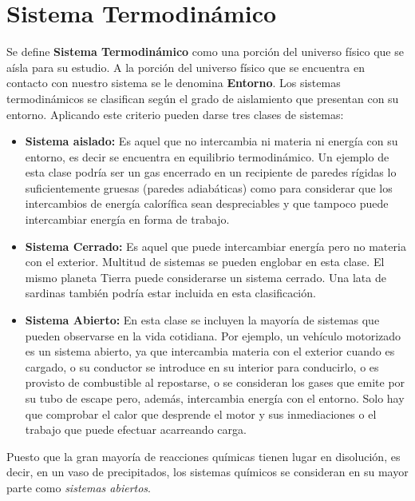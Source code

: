 \section{Sistema Termodinámico}

Se define \textbf{Sistema Termodinámico} como una porción del universo físico que se aísla para su estudio. A la porción del universo físico que se encuentra en contacto con nuestro sistema se le denomina \textbf{Entorno}. Los sistemas termodinámicos se clasifican según el grado de aislamiento que presentan con su entorno. Aplicando este criterio pueden darse tres clases de sistemas:\\

\begin{itemize}
	\item \textbf{Sistema aislado:} Es aquel que no intercambia ni materia ni energía con su entorno, es decir se encuentra en equilibrio termodinámico. Un ejemplo de esta clase podría ser un gas encerrado en un recipiente de paredes rígidas lo suficientemente gruesas (paredes adiabáticas) como para considerar que los intercambios de energía calorífica sean despreciables y que tampoco puede intercambiar energía en forma de trabajo.\\
	
	\item \textbf{Sistema Cerrado:} Es aquel que puede intercambiar energía pero no materia con el exterior. Multitud de sistemas se pueden englobar en esta clase. El mismo planeta Tierra puede considerarse un sistema cerrado. Una lata de sardinas también podría estar incluida en esta clasificación.\\
	
	\item \textbf{Sistema Abierto:} En esta clase se incluyen la mayoría de sistemas que pueden observarse en la vida cotidiana. Por ejemplo, un vehículo motorizado es un sistema abierto, ya que intercambia materia con el exterior cuando es cargado, o su conductor se introduce en su interior para conducirlo, o es provisto de combustible al repostarse, o se consideran los gases que emite por su tubo de escape pero, además, intercambia energía con el entorno. Solo hay que comprobar el calor que desprende el motor y sus inmediaciones o el trabajo que puede efectuar acarreando carga.\\
	
\end{itemize}
	
	Puesto que la gran mayoría de reacciones químicas tienen lugar en disolución, es decir, en un vaso de precipitados, los sistemas químicos se consideran en su mayor parte como \emph{sistemas abiertos}.
	
